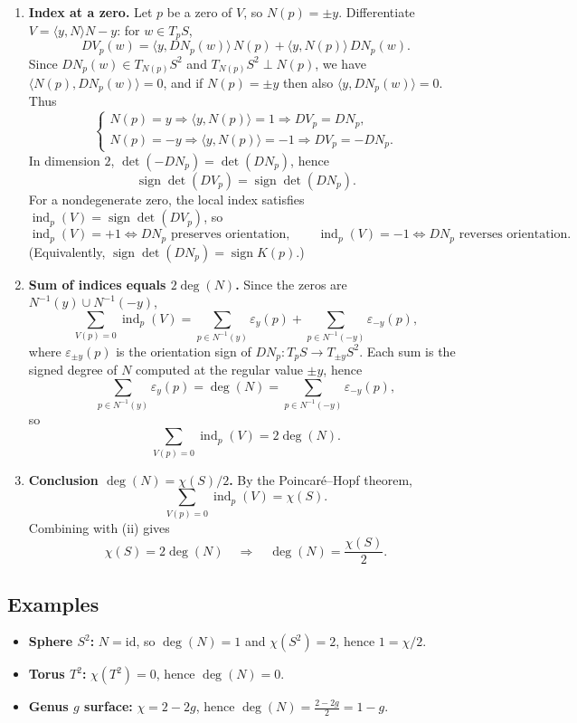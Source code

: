 \documentclass[12pt,a4paper]{article}
\theoremstyle{plain}
\theoremstyle{definition}      %
\begin{document}
\begin{enumerate}
	\item \textbf{Index at a zero.}
	Let $p$ be a zero of $V$, so $N(p)=\pm y$. Differentiate
	$V=\langle y,N\rangle N-y$:
	for $w\in T_pS$,
	\[
	DV_p(w)=\langle y,DN_p(w)\rangle\,N(p)+\langle y,N(p)\rangle\,DN_p(w).
	\]
	Since $DN_p(w)\in T_{N(p)}S^2$ and $T_{N(p)}S^2\perp N(p)$, we have
	$\langle N(p),DN_p(w)\rangle=0$, and if $N(p)=\pm y$ then also $\langle y,DN_p(w)\rangle=0$.
	Thus
	\[
	\begin{cases}
		N(p)=y \Rightarrow \langle y,N(p)\rangle=1 \Rightarrow DV_p=DN_p,\\
		N(p)=-y \Rightarrow \langle y,N(p)\rangle=-1 \Rightarrow DV_p=-DN_p.
	\end{cases}
	\]
	In dimension $2$, $\det(-DN_p)=\det(DN_p)$, hence
	\[
	\operatorname{sign}\det(DV_p)=\operatorname{sign}\det(DN_p).
	\]
	For a nondegenerate zero, the local index satisfies
	$\operatorname{ind}_p(V)=\operatorname{sign}\det(DV_p)$, so
	\[
	\operatorname{ind}_p(V)=+1 \iff DN_p \text{ preserves orientation},\qquad
	\operatorname{ind}_p(V)=-1 \iff DN_p \text{ reverses orientation}.
	\]
	(Equivalently, $\operatorname{sign}\det(DN_p)=\operatorname{sign}K(p)$.)
	
	\item \textbf{Sum of indices equals $2\deg(N)$.}
	Since the zeros are $N^{-1}(y)\cup N^{-1}(-y)$,
	\[
	\sum_{V(p)=0}\operatorname{ind}_p(V)
	=
	\sum_{p\in N^{-1}(y)}\varepsilon_y(p)+\sum_{p\in N^{-1}(-y)}\varepsilon_{-y}(p),
	\]
	where $\varepsilon_{\pm y}(p)$ is the orientation sign of $DN_p\colon T_pS\to T_{\pm y}S^2$.
	Each sum is the signed degree of $N$ computed at the regular value $\pm y$, hence
	\[
	\sum_{p\in N^{-1}(y)}\varepsilon_y(p)=\deg(N)=\sum_{p\in N^{-1}(-y)}\varepsilon_{-y}(p),
	\]
	so
	\[
	\sum_{V(p)=0}\operatorname{ind}_p(V)=2\deg(N).
	\]
	
	\item \textbf{Conclusion $\deg(N)=\chi(S)/2$.}
	By the Poincar\'e--Hopf theorem,
	\[
	\sum_{V(p)=0}\operatorname{ind}_p(V)=\chi(S).
	\]
	Combining with (ii) gives
	\[
	\chi(S)=2\deg(N)\quad\Rightarrow\quad \deg(N)=\frac{\chi(S)}{2}.
	\]
\end{enumerate}

\subsection*{Examples}
\begin{itemize}
	\item \textbf{Sphere $S^{2}$:} $N=\mathrm{id}$, so $\deg(N)=1$ and $\chi(S^{2})=2$, hence
	$1=\chi/2$.
	\item \textbf{Torus $T^{2}$:} $\chi(T^{2})=0$, hence $\deg(N)=0$.
	\item \textbf{Genus $g$ surface:} $\chi=2-2g$, hence $\deg(N)=\frac{2-2g}{2}=1-g$.
\end{itemize}
	
\end{document}
